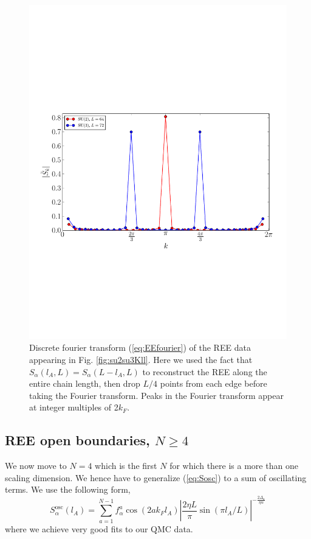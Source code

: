 \documentclass[aps,prb,reprint,floatfix]{revtex4-1}
\begin{document}
\begin{figure}
\centerline{\includegraphics[angle=0,width=1.0\columnwidth]{EE_fourierSu2Su3.pdf}}
\caption{Discrete fourier transform (\ref{eq:EEfourier}) of the REE data appearing in Fig. \ref{fig:su2su3Kll}.  Here we used the fact that $S_{\alpha}(l_{A},L)=S_{\alpha}(L-l_{A},L)$ to reconstruct the REE along the entire chain length, then drop $L/4$ points from each edge before taking the Fourier transform. Peaks in the Fourier transform appear at integer multiples of 2$k_{F}$.}
\label{fig:EEfouriersu2su3}
\end{figure}
\subsection{REE open boundaries, $N\geq4$} 
\label{subsec:REEopenBCNgeq4}
We now move to $N=4$ which is the first $N$ for which there is a more than one scaling dimension. We hence have to generalize (\ref{eq:Sosc}) to a sum of oscillating terms. We use the following form, 
{\allowdisplaybreaks
\begin{equation}
		S^{\mathrm{osc}}_{\alpha}(l_{A}) =\sum_{a=1}^{N-1} f_{\alpha}^{a}\cos(2ak_Fl_{A})\left|\frac{2\eta L}{\pi}\sin(\pi l_{A}/L)\right|^{-\frac{2\Delta_{a}}{\eta\alpha}}
\label{eq:Sosc2}
\end{equation}}
where we achieve very good fits to our QMC data. 
\end{document}
